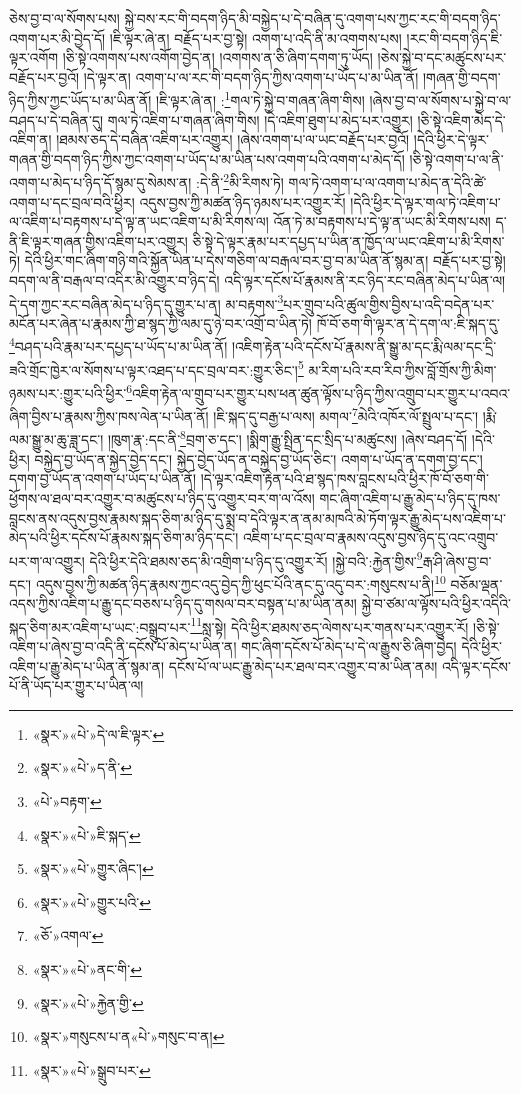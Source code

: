 ཅེས་བྱ་བ་ལ་སོགས་པས། སྐྱེ་བས་རང་གི་བདག་ཉིད་མི་བསྐྱེད་པ་དེ་བཞིན་དུ་འགག་པས་ཀྱང་རང་གི་བདག་ཉིད་འགག་པར་མི་བྱེད་དོ། །ཇི་ལྟར་ཞེ་ན། བརྗོད་པར་བྱ་སྟེ། འགག་པ་འདི་ནི་མ་འགགས་པས། །རང་གི་བདག་ཉིད་ཇི་ལྟར་འགོག །ཅི་སྟེ་འགགས་པས་འགོག་བྱེད་ན། །འགགས་ན་ཅི་ཞིག་དགག་ཏུ་ཡོད། །ཅེས་སྐྱེ་བ་དང་མཚུངས་པར་བརྗོད་པར་བྱའོ། །དེ་ལྟར་ན། འགག་པ་ལ་རང་གི་བདག་ཉིད་ཀྱིས་འགག་པ་ཡོད་པ་མ་ཡིན་ནོ། །གཞན་གྱི་བདག་ཉིད་ཀྱིས་ཀྱང་ཡོད་པ་མ་ཡིན་ནོ། །ཇི་ལྟར་ཞེ་ན། :\footnote{«སྣར་»«པེ་»དེ་ལ་ཇི་ལྟར་}གལ་ཏེ་སྐྱེ་བ་གཞན་ཞིག་གིས། །ཞེས་བྱ་བ་ལ་སོགས་པ་སྐྱེ་བ་ལ་བཤད་པ་དེ་བཞིན་དུ། གལ་ཏེ་འཇིག་པ་གཞན་ཞིག་གིས། །དེ་འཇིག་ཐུག་པ་མེད་པར་འགྱུར། །ཅི་སྟེ་འཇིག་མེད་དེ་འཇིག་ན། །ཐམས་ཅད་དེ་བཞིན་འཇིག་པར་འགྱུར། །ཞེས་འགག་པ་ལ་ཡང་བརྗོད་པར་བྱའོ། །དེའི་ཕྱིར་དེ་ལྟར་གཞན་གྱི་བདག་ཉིད་ཀྱིས་ཀྱང་འགག་པ་ཡོད་པ་མ་ཡིན་པས་འགག་པའི་འགག་པ་མེད་དོ། །ཅི་སྟེ་འགག་པ་ལ་ནི་འགག་པ་མེད་པ་ཉིད་དོ་སྙམ་དུ་སེམས་ན། :དེ་ནི་\footnote{«སྣར་»«པེ་»ད་ནི་}མི་རིགས་ཏེ། གལ་ཏེ་འགག་པ་ལ་འགག་པ་མེད་ན་དེའི་ཚེ་འགག་པ་དང་བྲལ་བའི་ཕྱིར། འདུས་བྱས་ཀྱི་མཚན་ཉིད་ཉམས་པར་འགྱུར་རོ། །དེའི་ཕྱིར་དེ་ལྟར་གལ་ཏེ་འཇིག་པ་ལ་འཇིག་པ་བརྟགས་པ་དེ་ལྟ་ན་ཡང་འཇིག་པ་མི་རིགས་ལ། འོན་ཏེ་མ་བརྟགས་པ་དེ་ལྟ་ན་ཡང་མི་རིགས་པས། ད་ནི་ཇི་ལྟར་གཞན་གྱིས་འཇིག་པར་འགྱུར། ཅི་སྟེ་དེ་ལྟར་རྣམ་པར་དཔྱད་པ་ཡིན་ན་ཁྱོད་ལ་ཡང་འཇིག་པ་མི་རིགས་ཏེ། དེའི་ཕྱིར་གང་ཞིག་གཉི་གའི་སྐྱོན་ཡིན་པ་དེས་གཅིག་ལ་བརྒལ་བར་བྱ་བ་མ་ཡིན་ནོ་སྙམ་ན། བརྗོད་པར་བྱ་སྟེ། བདག་ལ་ནི་བརྒལ་བ་འདིར་མི་འགྱུར་བ་ཉིད་དེ། འདི་ལྟར་དངོས་པོ་རྣམས་ནི་རང་ཉིད་རང་བཞིན་མེད་པ་ཡིན་ལ། དེ་དག་ཀྱང་རང་བཞིན་མེད་པ་ཉིད་དུ་གྱུར་པ་ན། མ་བརྟགས་\footnote{«པེ་»བརྟག་}པར་གྲུབ་པའི་ཚུལ་གྱིས་བྱིས་པ་འདི་བདེན་པར་མངོན་པར་ཞེན་པ་རྣམས་ཀྱི་ཐ་སྙད་ཀྱི་ལམ་དུ་ཉེ་བར་འགྲོ་བ་ཡིན་ཏེ། ཁོ་བོ་ཅག་གི་ལྟར་ན་དེ་དག་ལ་:ཇི་སྐད་དུ་\footnote{«སྣར་»«པེ་»ཇི་སྐད་}བཤད་པའི་རྣམ་པར་དཔྱད་པ་ཡོད་པ་མ་ཡིན་ནོ། །འཇིག་རྟེན་པའི་དངོས་པོ་རྣམས་ནི་སྒྱུ་མ་དང་རྨི་ལམ་དང་དྲི་ཟའི་གྲོང་ཁྱེར་ལ་སོགས་པ་ལྟར་འཐད་པ་དང་བྲལ་བར་:གྱུར་ཅིང་།\footnote{«སྣར་»«པེ་»གྱུར་ཞིང་།} མ་རིག་པའི་རབ་རིབ་ཀྱིས་བློ་གྲོས་ཀྱི་མིག་ཉམས་པར་:གྱུར་པའི་ཕྱིར་\footnote{«སྣར་»«པེ་»གྱུར་པའི་}འཇིག་རྟེན་ལ་གྲུབ་པར་གྱུར་པས་ཕན་ཚུན་ལྟོས་པ་ཉིད་ཀྱིས་འགྲུབ་པར་གྱུར་པ་འབའ་ཞིག་བྱིས་པ་རྣམས་ཀྱིས་ཁས་ལེན་པ་ཡིན་ནོ། །ཇི་སྐད་དུ་བརྒྱ་པ་ལས། མགལ་\footnote{«ཅོ་»འགལ་}མེའི་འཁོར་ལོ་སྤྲུལ་པ་དང་། །རྨི་ལམ་སྒྱུ་མ་ཆུ་ཟླ་དང་། །ཁུག་རྣ་:དང་ནི་\footnote{«སྣར་»«པེ་»ནང་གི་}བྲག་ཅ་དང་། །སྨིག་རྒྱུ་སྤྲིན་དང་སྲིད་པ་མཚུངས། །ཞེས་བཤད་དོ། །དེའི་ཕྱིར། བསྐྱེད་བྱ་ཡོད་ན་སྐྱེད་བྱེད་དང་། སྐྱེད་བྱེད་ཡོད་ན་བསྐྱེད་བྱ་ཡོད་ཅིང་། འགག་པ་ཡོད་ན་དགག་བྱ་དང་། དགག་བྱ་ཡོད་ན་འགག་པ་ཡོད་པ་ཡིན་ནོ། །དེ་ལྟར་འཇིག་རྟེན་པའི་ཐ་སྙད་ཁས་བླངས་པའི་ཕྱིར་ཁོ་བོ་ཅག་གི་ཕྱོགས་ལ་ཐལ་བར་འགྱུར་བ་མཚུངས་པ་ཉིད་དུ་འགྱུར་བར་ག་ལ་འོས། གང་ཞིག་འཇིག་པ་རྒྱུ་མེད་པ་ཉིད་དུ་ཁས་བླངས་ནས་འདུས་བྱས་རྣམས་སྐད་ཅིག་མ་ཉིད་དུ་སྨྲ་བ་དེའི་ལྟར་ན་ནམ་མཁའི་མེ་ཏོག་ལྟར་རྒྱུ་མེད་པས་འཇིག་པ་མེད་པའི་ཕྱིར་དངོས་པོ་རྣམས་སྐད་ཅིག་མ་ཉིད་དང་། འཇིག་པ་དང་བྲལ་བ་རྣམས་འདུས་བྱས་ཉིད་དུ་འང་འགྲུབ་པར་ག་ལ་འགྱུར། དེའི་ཕྱིར་དེའི་ཐམས་ཅད་མི་འགྲིག་པ་ཉིད་དུ་འགྱུར་རོ། །སྐྱེ་བའི་:རྐྱེན་གྱིས་\footnote{«སྣར་»«པེ་»རྐྱེན་གྱི་}རྒ་ཤི་ཞེས་བྱ་བ་དང་། འདུས་བྱས་ཀྱི་མཚན་ཉིད་རྣམས་ཀྱང་འདུ་བྱེད་ཀྱི་ཕུང་པོའི་ནང་དུ་འདུ་བར་:གསུངས་པ་ནི།\footnote{«སྣར་»གསུངས་པ་ན«པེ་»གསུང་བ་ན།} བཅོམ་ལྡན་འདས་ཀྱིས་འཇིག་པ་རྒྱུ་དང་བཅས་པ་ཉིད་དུ་གསལ་བར་བསྟན་པ་མ་ཡིན་ནམ། སྐྱེ་བ་ཙམ་ལ་ལྟོས་པའི་ཕྱིར་འདིའི་སྐད་ཅིག་མར་འཇིག་པ་ཡང་:བསྒྲུབ་པར་\footnote{«སྣར་»«པེ་»སྒྲུབ་པར་}སླ་སྟེ། དེའི་ཕྱིར་ཐམས་ཅད་ལེགས་པར་གནས་པར་འགྱུར་རོ། །ཅི་སྟེ་འཇིག་པ་ཞེས་བྱ་བ་འདི་ནི་དངོས་པོ་མེད་པ་ཡིན་ན། གང་ཞིག་དངོས་པོ་མེད་པ་དེ་ལ་རྒྱུས་ཅི་ཞིག་བྱེད། དེའི་ཕྱིར་འཇིག་པ་རྒྱུ་མེད་པ་ཡིན་ནོ་སྙམ་ན། དངོས་པོ་ལ་ཡང་རྒྱུ་མེད་པར་ཐལ་བར་འགྱུར་བ་མ་ཡིན་ནམ། འདི་ལྟར་དངོས་པོ་ནི་ཡོད་པར་གྱུར་པ་ཡིན་ལ། 